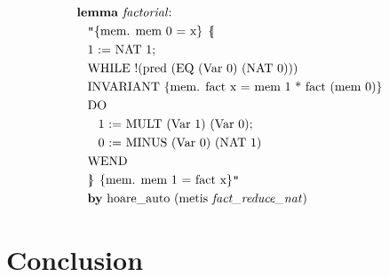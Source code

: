 \documentclass{llncs}
\newcommand{\llbrace}{\hspace{1pt} \lbrace \kern -3pt \vert \hspace{1pt}}
\newcommand{\rrbrace}{\hspace{0.5pt} \rbrace \kern -5pt \vert \hspace{3pt}}
\begin{document}
\begin{minipage}[T]{0.1\textwidth}
{
\begin{align*}
&\text{\textbf{lemma} \textit{factorial}:}\\
&\hspace{2ex}\text{\texttt{"}\{mem. mem 0 = x\} $\llbrace$}\\
&\hspace{2ex}\text{1 := NAT 1;}\\
&\hspace{2ex}\text{WHILE !(pred (EQ (Var 0) (NAT 0)))}\\
&\hspace{2ex}\text{INVARIANT \{mem. fact x = mem 1 * fact (mem 0)\}}\\
&\hspace{2ex}\text{DO}\\
&\hspace{4ex}\text{1 := MULT (Var 1) (Var 0);}\\
&\hspace{4ex}\text{0 := MINUS (Var 0) (NAT 1)}\\
&\hspace{2ex}\text{WEND}\\
&\hspace{2ex}\text{$\rrbrace$ \{mem. mem 1 = fact x\}\texttt{"}}\\
&\hspace{2ex}\text{\textbf{by} hoare\_auto (metis \textit{fact\_reduce\_nat})}
\end{align*}
}
\end{minipage}

\section{Conclusion}



\end{document}
